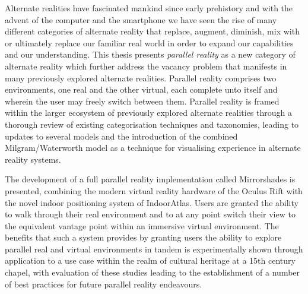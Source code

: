 Alternate realities have fascinated mankind since early prehistory and with the advent of the computer and the smartphone we have seen the rise of many different categories of alternate reality that replace, augment, diminish, mix with or ultimately replace our familiar real world in order to expand our capabilities and our understanding. This thesis presents \textit{parallel reality} as a new category of alternate reality which further address the vacancy problem that manifests in many previously explored alternate realities. Parallel reality comprises two environments, one real and the other virtual, each complete unto itself and wherein the user may freely switch between them. Parallel reality is framed within the larger ecosystem of previously explored alternate realities through a thorough review of existing categorisation techniques and taxonomies, leading to updates to several models and the introduction of the combined Milgram/Waterworth model as a technique for visualising experience in alternate reality systems.

The development of a full parallel reality implementation called Mirrorshades is presented, combining the modern virtual reality hardware of the Oculus Rift with the novel indoor positioning system of IndoorAtlas. Users are granted the ability to walk through their real environment and to at any point switch their view to the equivalent vantage point within an immersive virtual environment. The benefits that such a system provides by granting users the ability to explore parallel real and virtual environments in tandem is experimentally shown through application to a use case within the realm of cultural heritage at a 15th century chapel, with evaluation of these studies leading to the establishment of a number of best practices for future parallel reality endeavours.